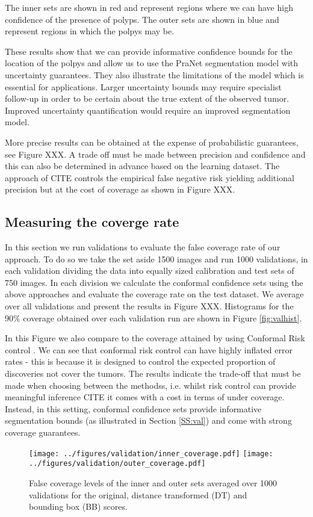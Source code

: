 The inner sets are shown in red and represent regions where we can have high confidence of the presence of polyps. The outer sets are shown in blue and represent regions in which the polpys may be.

These results show that we can provide informative confidence bounds for the location of the polpys and allow us to use the PraNet segmentation model with uncertainty guarantees. They also illustrate the limitations of the model which is essential for applications. Larger uncertainty bounds may require specialist follow-up in order to be certain about the true extent of the observed tumor. Improved uncertainty quantification would require an improved segmentation model. 

More precise results can be obtained at the expense of probabilistic guarantees, see Figure XXX. A trade off must be made between precision and confidence and this can also be determined in advance based on the learning dataset. The approach of CITE controls the empirical false negative risk yielding additional precision but at the cost of coverage as shown in Figure XXX. 

\subsection{Measuring the coverge rate}\label{SS:cov}
In this section we run validations to evaluate the false coverage rate of our approach. To do so we take the set aside 1500 images and run 1000 validations, in each validation dividing the data into equally sized calibration and test sets of 750 images. In each division we calculate the conformal confidence sets using the above approaches and evaluate the coverage rate on the test dataset. We average over all validations and present the results in Figure XXX. Histograms for the $90\%$ coverage obtained over each validation run are shown in Figure \ref{fig:valhist}.

 In this Figure we also compare to the coverage attained by using Conformal Risk control \cite{}. We can see that conformal risk control can have highly inflated error rates - this is because it is designed to control the expected proportion of discoveries not cover the tumors. The results indicate the trade-off that must be made when choosing between the methodss, i.e. whilst risk control can provide meaningful inference CITE it comes with a cost in terms of under coverage. Instead, in this setting, conformal confidence sets provide informative segmentation bounds (as illustrated in Section \ref{SS:val}) and come with strong coverage guarantees. 
\begin{figure}
	\begin{center}
		\texttt{[image: ../figures/validation/inner\_coverage.pdf]}
		\quad\quad
		\texttt{[image: ../figures/validation/outer\_coverage.pdf]}
	\end{center}
	\caption{False coverage levels of the inner and outer sets averaged over 1000 validations for the original, distance transformed (DT) and bounding box (BB) scores.}\label{fig:coverage}
\end{figure}

